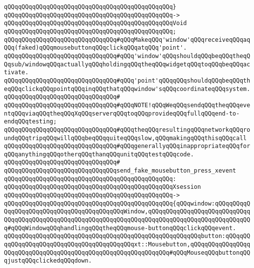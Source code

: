 \verb|qQQqqQQqqQQqqQQqqQQqqQQqqQQqqQQqqQQqqQQqqQQqqQQq}|\newline
\verb|qQQqqQQqqQQqqQQqqQQqqQQqqQQqqQQqqQQqqQQqqQQqqQQq->|\newline
\verb|qQQqqQQqqQQqqQQqqQQqqQQqqQQqqQQqqQQqqQQqqQQqqQQqVoid|\newline
\verb|qQQqqQQqqQQqqQQqqQQqqQQqqQQqqQQqqQQqqQQqqQQqqQQq;|\newline
\newline
\verb|qQQqqQQqqQQqqQQqqQQqqQQqqQQqqQQq#qQQqMakeqQQq'window'qQQqreceiveqQQqaqQQq(faked)qQQqmousebuttonqQQqclickqQQqatqQQq'point'.|\newline
\verb|qQQqqQQqqQQqqQQqqQQqqQQqqQQqqQQq#qQQq'window'qQQqshouldqQQqbeqQQqtheqQQqsub/windowqQQqactuallyqQQqholdingqQQqtheqQQqwidgetqQQqtoqQQqbeqQQqactivate.|\newline
\verb|qQQqqQQqqQQqqQQqqQQqqQQqqQQqqQQq#qQQq'point'qQQqqQQqshouldqQQqbeqQQqtheqQQqclickqQQqpointqQQqinqQQqthatqQQqwindow'sqQQqcoordinateqQQqsystem.|\newline
\verb|qQQqqQQqqQQqqQQqqQQqqQQqqQQqqQQq#|\newline
\verb|qQQqqQQqqQQqqQQqqQQqqQQqqQQqqQQq#qQQqNOTE!qQQqWeqQQqsendqQQqtheqQQqeventqQQqviaqQQqtheqQQqXqQQqserverqQQqtoqQQqprovideqQQqfullqQQqend-to-endqQQqtesting;|\newline
\verb|qQQqqQQqqQQqqQQqqQQqqQQqqQQqqQQq#qQQqtheqQQqresultingqQQqnetworkqQQqroundqQQqtripqQQqwillqQQqbeqQQqquiteqQQqslow,qQQqmakingqQQqthisqQQqcall|\newline
\verb|qQQqqQQqqQQqqQQqqQQqqQQqqQQqqQQq#qQQqgenerallyqQQqinappropriateqQQqforqQQqanythingqQQqotherqQQqthanqQQqunitqQQqtestqQQqcode.|\newline
\verb|qQQqqQQqqQQqqQQqqQQqqQQqqQQqqQQq#|\newline
\verb|qQQqqQQqqQQqqQQqqQQqqQQqqQQqqQQqsend_fake_mousebutton_press_xevent|\newline
\verb|qQQqqQQqqQQqqQQqqQQqqQQqqQQqqQQqqQQqqQQqqQQqqQQq:|\newline
\verb|qQQqqQQqqQQqqQQqqQQqqQQqqQQqqQQqqQQqqQQqqQQqqQQqXsession|\newline
\verb|qQQqqQQqqQQqqQQqqQQqqQQqqQQqqQQqqQQqqQQqqQQqqQQq->|\newline
\verb|qQQqqQQqqQQqqQQqqQQqqQQqqQQqqQQqqQQqqQQqqQQqqQQq{qQQqwindow:qQQqqQQqqQQqqQQqqQQqqQQqqQQqqQQqqQQqqQQqqQQqWindow,qQQqqQQqqQQqqQQqqQQqqQQqqQQqqQQqqQQqqQQqqQQqqQQqqQQqqQQqqQQqqQQqqQQqqQQqqQQqqQQqqQQqqQQqqQQqqQQqqQQq#qQQqWindowqQQqhandlingqQQqtheqQQqmouse-buttonqQQqclickqQQqevent.|\newline
\verb|qQQqqQQqqQQqqQQqqQQqqQQqqQQqqQQqqQQqqQQqqQQqqQQqqQQqqQQqbutton:qQQqqQQqqQQqqQQqqQQqqQQqqQQqqQQqqQQqqQQqqQQqxt::Mousebutton,qQQqqQQqqQQqqQQqqQQqqQQqqQQqqQQqqQQqqQQqqQQqqQQqqQQqqQQqqQQqqQQq#qQQqMouseqQQqbuttonqQQqjustqQQqclickedqQQqdown.|\newline

